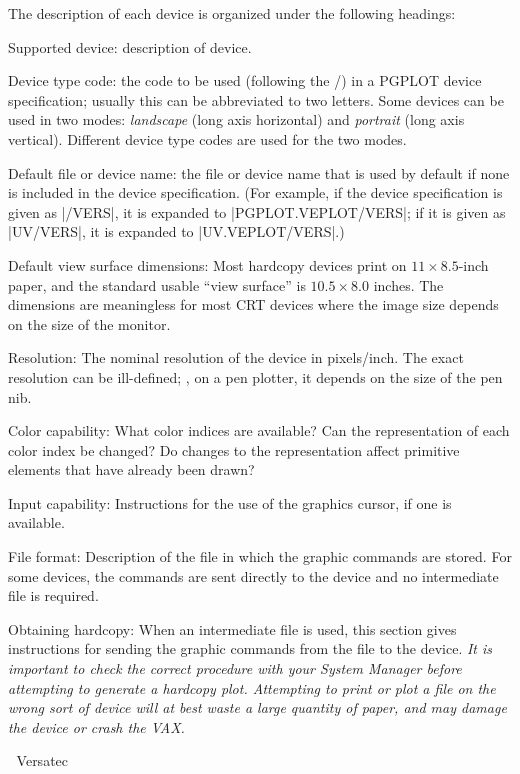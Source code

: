 The description of each device is organized under the following headings:

\proclaim Supported device: description of device.

\proclaim Device type code: the code to be used (following the /) in a
PGPLOT device specification; usually this can be abbreviated to two 
letters.  Some devices can be used in two modes: {\it landscape\/} (long 
axis horizontal) and {\it portrait\/} (long axis vertical). Different 
device type codes are used for the two modes.

\proclaim Default file or device name: the file or device name that is 
used by default if none is included in the device specification. (For 
example, if the device specification is given as |/VERS|, it is expanded
to |PGPLOT.VEPLOT/VERS|; if it is given as |UV/VERS|, it is expanded to
|UV.VEPLOT/VERS|.) 

\proclaim Default view surface dimensions:
Most hardcopy devices print on $11\times8.5$-inch paper, and the 
standard usable ``view surface'' is $10.5\times8.0$ inches. The 
dimensions are meaningless for most CRT devices where the image size 
depends on the size of the monitor.

\proclaim Resolution:
The nominal resolution of the device in pixels/inch. The exact 
resolution can be ill-defined; \eg, on a pen plotter, it depends on the
size of the pen nib.

\proclaim Color capability:
What color indices are available?  Can the representation of each 
color index be changed?  Do changes to the representation affect 
primitive elements that have already been drawn?

\proclaim Input capability:
Instructions for the use of the graphics cursor, if one is available.

\proclaim File format:
Description of the file in which the graphic commands are stored. For
some devices, the commands are sent directly to the device and no 
intermediate file is required.

\proclaim Obtaining hardcopy:
When an intermediate file is used, this section gives instructions for 
sending the graphic commands from the file to the device.
{\it It is important to check the correct procedure with your
System Manager before attempting to generate a hardcopy plot. 
Attempting to print or plot a file on the wrong sort of device will at
best waste a large quantity of paper, and may damage the device or crash
the VAX.}


\beginsection Versatec

